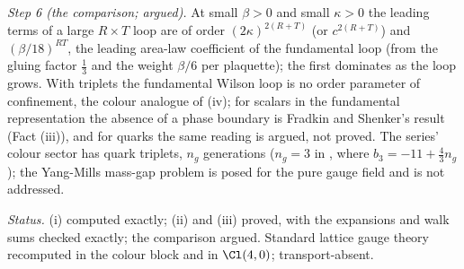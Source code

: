 \emph{Step 6 (the comparison; argued).} At small $\beta > 0$ and small $\kappa > 0$ the leading terms of a large $R \times T$ loop are of order $(2\kappa)^{2(R + T)}$ (or $c^{2(R + T)}$) and $(\beta/18)^{RT}$, the leading area-law coefficient of the fundamental loop (from the gluing factor $\tfrac13$ and the weight $\beta/6$ per plaquette); the first dominates as the loop grows. With triplets the fundamental Wilson loop is no order parameter of confinement, the colour analogue of (iv); for scalars in the fundamental representation the absence of a phase boundary is Fradkin and Shenker's result (Fact (iii)), and for quarks the same reading is argued, not proved. The series' colour sector has quark triplets, $n_{g}$ generations ($n_{g} = 3$ in , where $b_{3} = -11 + \tfrac43n_{g}$); the Yang-Mills mass-gap problem is posed for the pure gauge field and is not addressed.

\emph{Status.} (i) computed exactly; (ii) and (iii) proved, with the expansions and walk sums checked exactly; the comparison argued. Standard lattice gauge theory recomputed in the colour block and in $\Cl(4,0)$; transport-absent.
